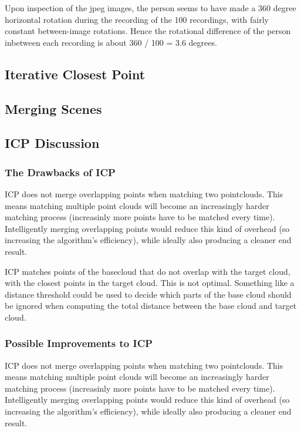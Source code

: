 \documentclass[11pt,english]{article}
\begin{document}
\noindent
Upon inspection of the jpeg images, the person seems to have made a 360 degree horizontal rotation during the recording of the 100 recordings, with fairly constant between-image rotations. Hence the rotational difference of the person inbetween each recording is about 360 / 100 = 3.6 degrees.\\


\subsection{Iterative Closest Point}


\subsection{Merging Scenes}


\subsection{ICP Discussion}

\subsubsection{The Drawbacks of ICP}
ICP does not merge overlapping points when matching two pointclouds. This means matching multiple point clouds will become an increasingly harder matching process (increasinly more points have to be matched every time). Intelligently merging overlapping points would reduce this kind of overhead (so increasing the algorithm's efficiency), while ideally also producing a cleaner end result.

ICP matches points of the basecloud that do not overlap with the target cloud, with the closest points in the target cloud. This is not optimal. Something like a distance threshold could be used to decide which parts of the base cloud should be ignored when computing the total distance between the base cloud and target cloud.


\subsubsection{Possible Improvements to ICP}
ICP does not merge overlapping points when matching two pointclouds. This means matching multiple point clouds will become an increasingly harder matching process (increasinly more points have to be matched every time). Intelligently merging overlapping points would reduce this kind of overhead (so increasing the algorithm's efficiency), while ideally also producing a cleaner end result.
\end{document}
